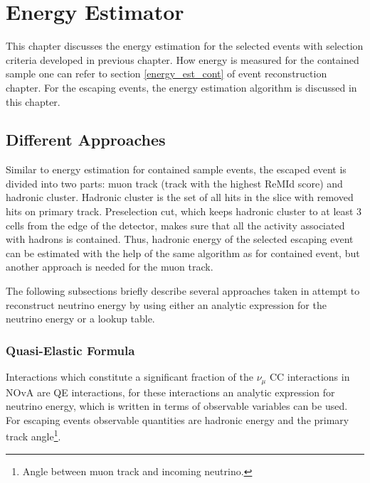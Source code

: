 \chapter{Energy Estimator}
\label{energy_estimator_chapter}

This chapter discusses the energy estimation for the selected events with selection
criteria developed in previous chapter. How energy is measured for the contained 
sample one can refer to section \ref{energy_est_cont} of event reconstruction chapter.
For the escaping events, the energy estimation algorithm is discussed in this chapter.

\section{Different Approaches}
Similar to energy estimation for contained sample events, the escaped event is divided
into two parts: muon track (track with the highest ReMId score) and hadronic cluster.
Hadronic cluster is the set of all hits in the slice with removed hits on primary 
track. Preselection cut, which keeps hadronic cluster to at least 3 cells from
the edge of the detector, makes sure that all the activity associated with hadrons is
contained. Thus, hadronic energy of the selected escaping event can be estimated
with the help of the same algorithm as for contained event, but another approach is needed
for the muon track.

The following subsections briefly describe several approaches taken in attempt to reconstruct
neutrino energy by using either an analytic expression for the neutrino energy or a 
lookup table.

\subsection{Quasi-Elastic Formula}
Interactions which constitute a significant fraction of the $\nu_\mu$ CC interactions 
in NOvA are QE interactions, for these interactions an analytic expression for
neutrino energy, which is written in terms of observable variables can be used. For escaping events
observable quantities are hadronic energy and the primary track angle\footnote{Angle
between muon track and incoming neutrino.}. 

